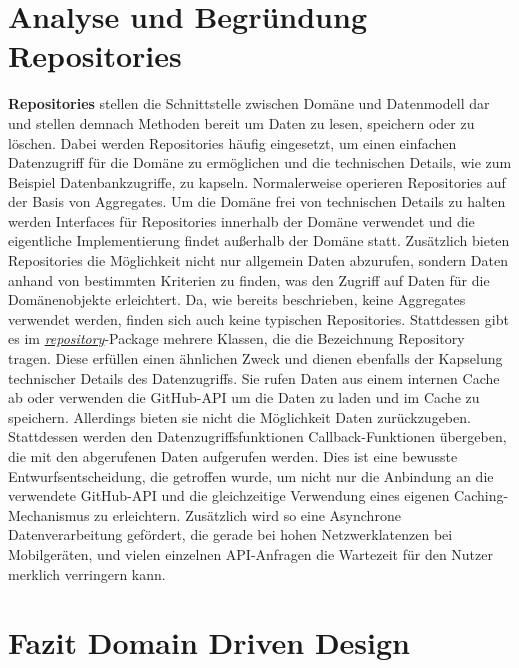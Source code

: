\documentclass[12pt]{article}
\begin{document}
\newpage

\section{Analyse und Begründung Repositories}
\textbf{Repositories} stellen die Schnittstelle zwischen Domäne und Datenmodell dar und stellen demnach Methoden bereit um Daten zu lesen, speichern oder zu löschen.
Dabei werden Repositories häufig eingesetzt, um einen einfachen Datenzugriff für die Domäne zu ermöglichen und die technischen Details, wie zum Beispiel Datenbankzugriffe, zu kapseln.
Normalerweise operieren Repositories auf der Basis von Aggregates.
Um die Domäne frei von technischen Details zu halten werden Interfaces für Repositories innerhalb der Domäne verwendet und die eigentliche Implementierung findet außerhalb der Domäne statt.
Zusätzlich bieten Repositories die Möglichkeit nicht nur allgemein Daten abzurufen, sondern Daten anhand von bestimmten Kriterien zu finden, was den Zugriff auf Daten für die Domänenobjekte erleichtert.
\newline
Da, wie bereits beschrieben, keine Aggregates verwendet werden, finden sich auch keine typischen Repositories.
Stattdessen gibt es im \textit{\href{https://github.com/lukaspanni/OpenSourceStats/tree/main/app/src/main/java/de/lukaspanni/opensourcestats/repository/}{repository}}-Package mehrere Klassen, die die Bezeichnung Repository tragen.
Diese erfüllen einen ähnlichen Zweck und dienen ebenfalls der Kapselung technischer Details des Datenzugriffs.
Sie rufen Daten aus einem internen Cache ab oder verwenden die GitHub-API um die Daten zu laden und im Cache zu speichern.
Allerdings bieten sie nicht die Möglichkeit Daten zurückzugeben. 
Stattdessen werden den Datenzugriffsfunktionen Callback-Funktionen übergeben, die mit den abgerufenen Daten aufgerufen werden.
Dies ist eine bewusste Entwurfsentscheidung, die getroffen wurde, um nicht nur die Anbindung an die verwendete GitHub-API und die gleichzeitige Verwendung eines eigenen Caching-Mechanismus zu erleichtern.
Zusätzlich wird  so eine Asynchrone Datenverarbeitung gefördert, die gerade bei hohen Netzwerklatenzen bei Mobilgeräten, und vielen einzelnen API-Anfragen die Wartezeit für den Nutzer merklich verringern kann.

\section{Fazit Domain Driven Design}
\end{document}
